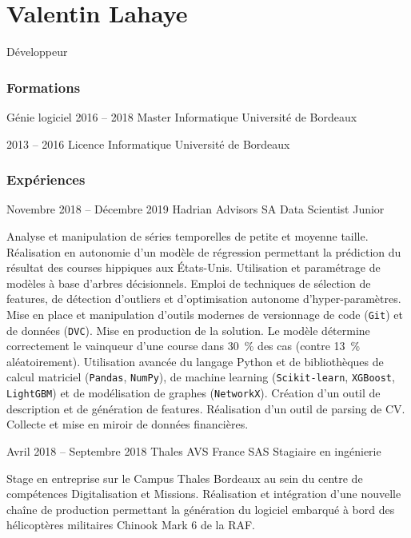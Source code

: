 \documentclass{tccv}
\begin{document}
\part{Valentin Lahaye}{Développeur}

\section{Formations}
\begin{yearlist}

\item[Génie logiciel]{2016 -- 2018}
     {Master Informatique}
     {Université de Bordeaux}

\item{2013 -- 2016}
     {Licence Informatique}
     {Université de Bordeaux}

\end{yearlist}

\section{Expériences}
\begin{eventlist}

\item{Novembre 2018 -- Décembre 2019}
     {Hadrian Advisors SA}
     {Data Scientist Junior}

Analyse et manipulation de séries temporelles de petite et moyenne taille. Réalisation en autonomie d'un modèle de régression permettant la prédiction du résultat des courses hippiques aux \'Etats-Unis. Utilisation et paramétrage de modèles à base d'arbres décisionnels. Emploi de techniques de sélection de features, de détection d'outliers et d'optimisation autonome d'hyper-paramètres. Mise en place et manipulation d'outils modernes de versionnage de code (\texttt{Git}) et de données (\texttt{DVC}). Mise en production de la solution. Le modèle détermine correctement le vainqueur d'une course dans 30~\% des cas (contre 13~\% aléatoirement). Utilisation avancée du langage Python et de bibliothèques de calcul matriciel (\texttt{Pandas}, \texttt{NumPy}), de machine learning (\texttt{Scikit-learn}, \texttt{XGBoost}, \texttt{LightGBM}) et de modélisation de graphes (\texttt{NetworkX}). Création d'un outil de description et de génération de features. Réalisation d'un outil de parsing de CV. Collecte et mise en miroir de données financières.

\item{Avril 2018 -- Septembre 2018}
     {Thales AVS France SAS}
     {Stagiaire en ingénierie}

Stage en entreprise sur le Campus Thales Bordeaux au sein du centre de compétences Digitalisation et Missions. Réalisation et intégration d'une nouvelle\\ chaîne de production permettant la génération du logiciel embarqué à bord des hélicoptères militaires Chinook Mark 6 de la RAF.

\end{eventlist}
\end{document}
